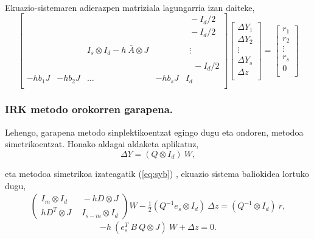 \paragraph*{} Ekuazio-sistemaren adierazpen matriziala lagungarria izan daiteke,
\begin{equation*}
\begin{bmatrix}
    &      &      &  & \ \ -I_d/2 \\
    &      &      &  & \ \ -I_d/2 \\
    &      &      &  & \ \      \\    
    &  & I_s \otimes I_d- h \ \bar{A} \otimes J & & \ \ \vdots \\
    &      &      &  & \ \      \\
    &      &      &  & \ \ \ \ -I_d/2    \\
-hb_1 J & -hb_2 J & \dots & -hb_s J &  I_d\\ 
\end{bmatrix}
\begin{bmatrix}
\Delta Y_1 \\
\Delta Y_2 \\
\vdots \\
\Delta Y_s \\
\Delta z\\
\end{bmatrix}=
\begin{bmatrix}
r_1 \\
r_2 \\
\vdots \\
r_s \\
0\\
\end{bmatrix}
\end{equation*} 

\subsubsection*{IRK metodo orokorren garapena.}

Lehengo, garapena metodo sinplektikoentzat egingo dugu eta ondoren, metodoa simetrikoentzat. Honako aldagai aldaketa aplikatuz,
\begin{equation*}
 \Delta Y = (Q \otimes I_d) \ W,
\end{equation*}

eta metodoa simetrikoa izateagatik (\ref{eq:syb}) , ekuazio sistema baliokidea lortuko dugu,
\begin{multline*}
\left(
\begin{matrix}
I_m \otimes I_d & \ \ -h D \otimes J \\
hD^T \otimes J &  \ \ I_{s-m} \otimes I_d 
\end{matrix}
\right)
 W- \frac{1}{2}(Q^{-1} e_s \otimes I_d) \ \Delta z = (Q^{-1} \otimes I_d) \ r,
\end{multline*}
\begin{equation*}
- h \ (e_s^T \ B \ Q \otimes J) \ W + \Delta z =0.
\end{equation*}

